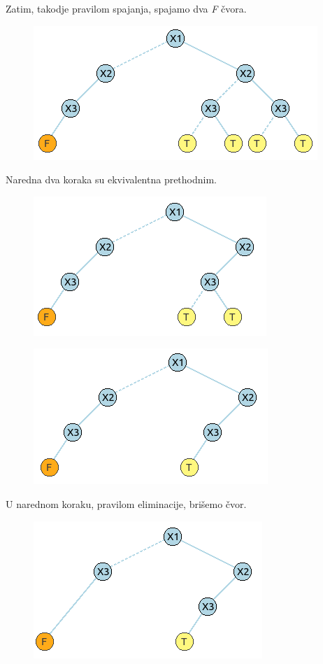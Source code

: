 \begin{exmp}
    Zatim, takodje pravilom spajanja, spajamo dva \emph{F} \v{c}vora.
    
    \begin{figure}[H]
        \centering
        \includegraphics{slike/primer/02.png}
    \end{figure}
    
    Naredna dva koraka su ekvivalentna prethodnim.
    
    \begin{figure}[H]
        \centering
        \includegraphics{slike/primer/03.png}
    \end{figure}
    
    \begin{figure}[H]
        \centering
        \includegraphics{slike/primer/04.png}
    \end{figure}
    
    U narednom koraku, pravilom eliminacije, bri\v{s}emo \v{c}vor.
    
    \begin{figure}[H]
        \centering
        \includegraphics{slike/primer/05.png}
    \end{figure}
    

\end{exmp}
